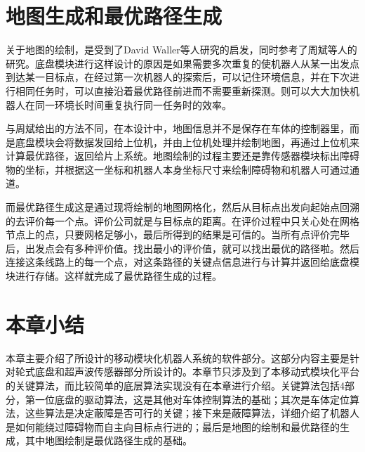 \section{地图生成和最优路径生成}
关于地图的绘制，是受到了David Waller等人研究的启发，同时参考了周斌等人的研究。底盘模块进行这样设计的原因是如果需要多次重复的使机器人从某一出发点到达某一目标点，在经过第一次机器人的探索后，可以记住环境信息，并在下次进行相同任务时，可以直接沿着最优路径前进而不需要重新探测。则可以大大加快机器人在同一环境长时间重复执行同一任务时的效率。

与周斌给出的方法不同，在本设计中，地图信息并不是保存在车体的控制器里，而是底盘模块会将数据发回给上位机，并由上位机处理并绘制地图，再通过上位机来计算最优路径，返回给片上系统。地图绘制的过程主要还是靠传感器模块标出障碍物的坐标，并根据这一坐标和机器人本身坐标尺寸来绘制障碍物和机器人可通过通道。

而最优路径生成这是通过现将绘制的地图网格化，然后从目标点出发向起始点回溯的去评价每一个点。评价公司就是与目标点的距离。在评价过程中只关心处在网格节点上的点，只要网格足够小，最后所得到的结果是可信的。当所有点评价完毕后，出发点会有多种评价值。找出最小的评价值，就可以找出最优的路径啦。然后连接这条线路上的每一个点，对这条路径的关键点信息进行与计算并返回给底盘模块进行存储。这样就完成了最优路径生成的过程。

\section{本章小结}
本章主要介绍了所设计的移动模块化机器人系统的软件部分。这部分内容主要是针对轮式底盘和超声波传感器部分所设计的。本章节只涉及到了本移动式模块化平台的关键算法，而比较简单的底层算法实现没有在本章进行介绍。关键算法包括4部分，第一位底盘的驱动算法，这是其他对车体控制算法的基础；其次是车体定位算法，这些算法是决定蔽障是否可行的关键；接下来是蔽障算法，详细介绍了机器人是如何能绕过障碍物而自主向目标点行进的；最后是地图的绘制和最优路径的生成，其中地图绘制是最优路径生成的基础。